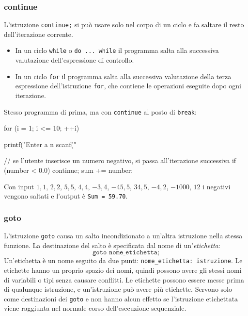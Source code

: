 \documentclass[11pt,a4paper]{article}
\begin{document}
\subsubsection{continue}

L'istruzione \lstinline|continue;| si può usare solo nel corpo di un ciclo e fa saltare il resto dell'iterazione corrente.
\begin{itemize}
    \item In un ciclo \lstinline|while| o \lstinline|do ... while| il programma salta alla successiva valutazione dell'espressione di controllo.
    \item In un ciclo \lstinline|for| il programma salta alla successiva valutazione della terza espressione dell'istruzione \lstinline|for|, che contiene le operazioni eseguite dopo ogni iterazione.
\end{itemize}

\begin{esempio}
Stesso programma di prima, ma con \lstinline|continue| al posto di \lstinline|break|:
\begin{codice}
for (i = 1; i <= 10; ++i)
{
    printf("Enter a n%
    scanf("%

    // se l'utente inserisce un numero negativo, si passa all'iterazione successiva
    if (number < 0.0)
    {
        continue;
    }
    sum += number;
}
\end{codice}
Con input $1{,}1$, $2{,}2$, $5{,}5$, $4{,}4$, $-3{,}4$, $-45{,}5$, $34{,}5$, $-4{,}2$, $-1000$, $12$ i negativi vengono saltati e l'output è \texttt{Sum = 59.70}.
\end{esempio}

\subsubsection{goto}

L'istruzione \lstinline|goto| causa un salto incondizionato a un'altra istruzione nella stessa funzione. La destinazione del salto è specificata dal nome di un'\emph{etichetta}:
\[
\texttt{goto nome\_etichetta;}
\]
Un'etichetta è un nome seguito da due punti: \texttt{nome\_etichetta: istruzione}. Le etichette hanno un proprio spazio dei nomi, quindi possono avere gli stessi nomi di variabili o tipi senza causare conflitti. Le etichette possono essere messe prima di qualunque istruzione, e un'istruzione può avere più etichette. Servono solo come destinazioni dei \lstinline|goto| e non hanno alcun effetto se l'istruzione etichettata viene raggiunta nel normale corso dell'esecuzione sequenziale.
\end{document}
